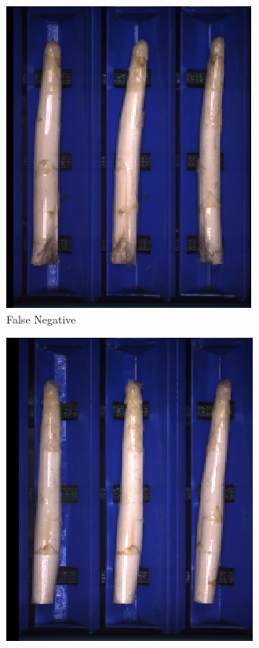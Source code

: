\begin{figure}[!htb]
	\centering
	\begin{subfigure}{0.3\textwidth}
		\includegraphics[width=0.9\linewidth]{Figures/chapter04/hollow_falsenegative_01.png}
		\vspace{-5pt}
		\caption{False Negative}
	\end{subfigure}
	\begin{subfigure}{0.3\textwidth}
		\includegraphics[width=0.9\linewidth]{Figures/chapter04/hollow_falsenegative_02.png}

\end{subfigure}
\end{figure}
